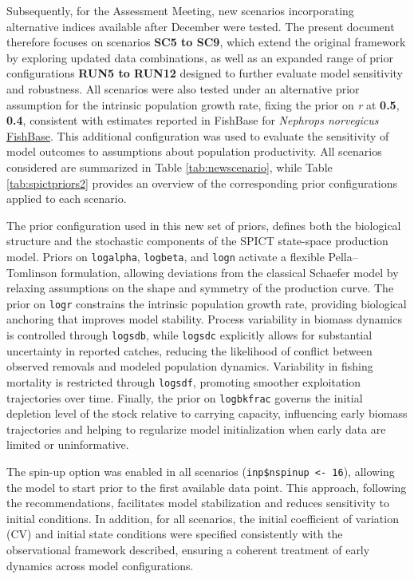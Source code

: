 \documentclass[
  12pt,
]{article}
\begin{document}
Subsequently, for the Assessment Meeting, new scenarios incorporating alternative indices available after December were tested. The present document therefore focuses on scenarios \textbf{SC5 to SC9}, which extend the original framework by exploring updated data combinations, as well as an expanded range of prior configurations \textbf{RUN5 to RUN12} designed to further evaluate model sensitivity and robustness. All scenarios were also tested under an alternative prior assumption for the intrinsic population growth rate, fixing the prior on \emph{r} at \textbf{0.5}, \textbf{0.4}, consistent with estimates reported in FishBase for \emph{Nephrops norvegicus} \href{https://www.sealifebase.ca/summary/Nephrops-norvegicus.html}{FishBase}. This additional configuration was used to evaluate the sensitivity of model outcomes to assumptions about population productivity. All scenarios considered are summarized in Table \ref{tab:newscenario}, while Table \ref{tab:spictpriors2} provides an overview of the corresponding prior configurations applied to each scenario.

The prior configuration used in this new set of priors, defines both the biological structure and the stochastic components of the SPICT state-space production model. Priors on \texttt{logalpha}, \texttt{logbeta}, and \texttt{logn} activate a flexible Pella--Tomlinson formulation, allowing deviations from the classical Schaefer model by relaxing assumptions on the shape and symmetry of the production curve. The prior on \texttt{logr} constrains the intrinsic population growth rate, providing biological anchoring that improves model stability. Process variability in biomass dynamics is controlled through \texttt{logsdb}, while \texttt{logsdc} explicitly allows for substantial uncertainty in reported catches, reducing the likelihood of conflict between observed removals and modeled population dynamics. Variability in fishing mortality is restricted through \texttt{logsdf}, promoting smoother exploitation trajectories over time. Finally, the prior on \texttt{logbkfrac} governs the initial depletion level of the stock relative to carrying capacity, influencing early biomass trajectories and helping to regularize model initialization when early data are limited or uninformative.

The spin-up option was enabled in all scenarios (\texttt{inp\$nspinup\ \textless{}-\ 16}), allowing the model to start prior to the first available data point. This approach, following the recommendations, facilitates model stabilization and reduces sensitivity to initial conditions. In addition, for all scenarios, the initial coefficient of variation (CV) and initial state conditions were specified consistently with the observational framework described, ensuring a coherent treatment of early dynamics across model configurations.
\end{document}

